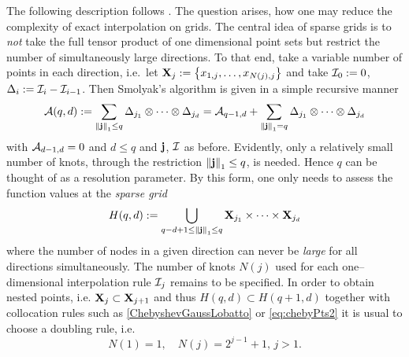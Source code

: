 \documentclass[12pt, oneside]{amsart}
\theoremstyle{definition}
\theoremstyle{remark}
\numberwithin{equation}{section}
\begin{document}
The following description follows \cite{BarthelmannHighDim_2000}.
The question arises, how one may reduce the complexity of exact interpolation on grids. The central idea of sparse grids is to \emph{not} take the full tensor product of one dimensional point sets but restrict the number of simultaneously large directions. To that end, take a variable number of points in each direction, i.e.\ let \(\XX_j \defn \set{x_{1, j}, \dots, x_{N(j), j}}\) and take \(\cI_0 \defn 0\), \(\Delta_i \defn \cI_i - \cI_{i-1}\). Then Smolyak's algorithm is given in a simple recursive manner
\begin{equation}\label{Smolyak}
    \cA(q, d) \defn \sum_{\norm[1]{\bfj} \leq q} \Delta_{j_1} \otimes \cdots \otimes \Delta_{j_d} = \cA_{q-1, d}+\sum_{\norm[1]{\bfj}=q} \Delta_{j_1} \otimes \cdots \otimes \Delta_{j_d}
\end{equation}
with \(\cA_{d-1, d} = 0\) and \(d \leq q\) and \(\bfj\), \(\cI\) as before. Evidently, only a relatively small number of knots, through the restriction \(\norm[1]{\bfj} \leq q\), is needed. Hence \(q\) can be thought of as a resolution parameter. By this form, one only needs to assess the function values at the \emph{sparse grid} \[
	H(q, d) \defn \bigcup_{q-d+1 \leq \norm[1]{\bfj} \leq q} \XX_{j_1} \times \cdots \times \XX_{j_d}
\]
where the number of nodes in a given direction can never be \emph{large} for all directions simultaneously. The number of knots \(N(j)\) used for each one--dimensional interpolation rule \(\cI_j\) remains to be specified. In order to obtain nested points, i.e. \(\XX_j \subset \XX_{j+1}\) and thus \(H(q, d) \subset H(q+1,d)\) together with collocation rules such as \cref{ChebyshevGaussLobatto} or \cref{eq:chebyPts2} it is usual to choose a doubling rule, i.e. \[
	N(1) = 1,\quad N(j) = 2^{j-1}+1,\, j > 1.
\]
\end{document}
